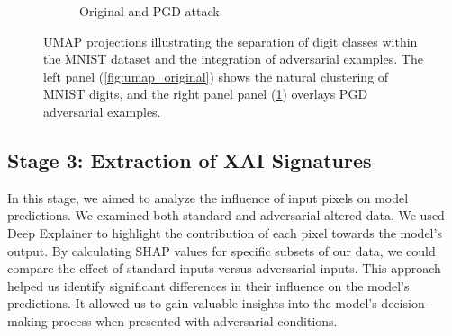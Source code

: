 \documentclass[10pt, conference, a4paper, final]{IEEEtran}
\begin{document}
\begin{figure}[!ht]
\begin{subfigure}{.50\textwidth}
        \caption{Original and PGD attack}
        \label{fig:umap_pgd}
    \end{subfigure}
    \caption{UMAP projections illustrating the separation of digit classes within the MNIST dataset and the integration of adversarial examples.
     The left panel (\ref{fig:umap_original}) shows the natural clustering of MNIST digits, and the right panel panel (\ref{fig:umap_pgd}) overlays PGD 
     adversarial examples.}
    \label{fig:umap}
\end{figure}



\subsection{Stage 3: Extraction of XAI Signatures}
In this stage, we aimed to analyze the influence of input pixels on model predictions. We examined both standard and adversarial altered data. We used Deep Explainer to highlight the contribution of each pixel towards the model's output. By calculating SHAP values for specific subsets of our data, we could compare the effect of standard inputs versus adversarial inputs. This approach helped us identify significant differences in their influence on the model's predictions. It allowed us to gain valuable insights into the model's decision-making process when presented with adversarial conditions.
\end{document}
